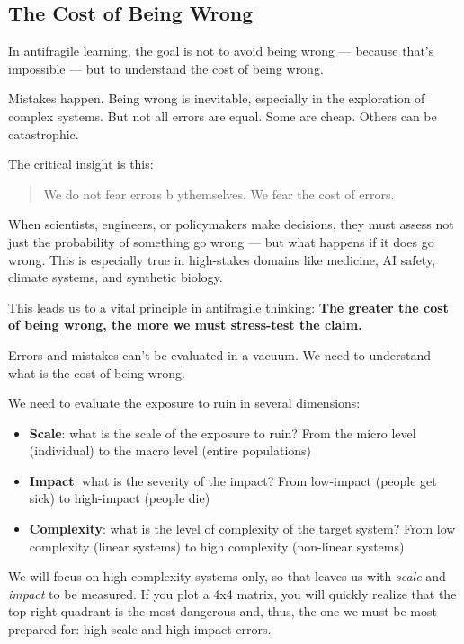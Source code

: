 \subsection{The Cost of Being Wrong}

In antifragile learning, the goal is not to avoid being wrong — because that’s impossible — but to understand the cost of being wrong.

Mistakes happen. Being wrong is inevitable, especially in the exploration of complex systems. But not all errors are equal. Some are cheap. Others can be catastrophic. 

The critical insight is this:
\begin{quote}
	We do not fear errors b ythemselves. We fear the cost of errors.
\end{quote}

When scientists, engineers, or policymakers make decisions, they must assess not just the probability of something go wrong — but what happens if 
it does go wrong. This is especially true in high-stakes domains like medicine, AI safety, climate systems, and synthetic biology.

This leads us to a vital principle in antifragile thinking: \textbf{The greater the cost of being wrong, the more we must stress-test the claim.}

Errors and mistakes can't be evaluated in a vacuum. We need to understand what is the cost of being wrong. 

We need to evaluate the exposure to ruin in several dimensions:

\begin{itemize}
	\item \textbf{Scale}: what is the scale of the exposure to ruin? From the micro level (individual) to the macro level (entire populations)
	\item \textbf{Impact}: what is the severity of the impact? From low-impact (people get sick) to high-impact (people die)
	\item \textbf{Complexity}: what is the level of complexity of the target system? From low complexity (linear systems) to high complexity (non-linear systems)
\end{itemize}

We will focus on high complexity systems only, so that leaves us with \textit{scale} and \textit{impact} to be measured.
If you plot a 4x4 matrix, you will quickly realize that the top right quadrant is the most dangerous and, thus, the one we must be most prepared for: high scale and high impact errors.

